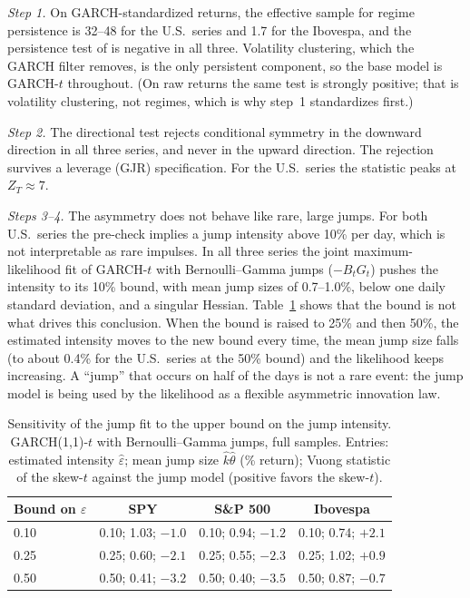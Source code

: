 \documentclass[11pt,a4paper]{article}
\theoremstyle{definition}
\theoremstyle{remark}
\begin{document}
\emph{Step 1.} On GARCH-standardized returns, the effective sample for regime persistence is 32--48 for the U.S.\ series and 1.7 for the Ibovespa, and the persistence test of \citet{giornoA} is negative in all three. Volatility clustering, which the GARCH filter removes, is the only persistent component, so the base model is GARCH-$t$ throughout. (On raw returns the same test is strongly positive; that is volatility clustering, not regimes, which is why step~1 standardizes first.)

\emph{Step 2.} The directional test rejects conditional symmetry in the downward direction in all three series, and never in the upward direction. The rejection survives a leverage (GJR) specification. For the U.S.\ series the statistic peaks at $Z_T\approx7$.

\emph{Steps 3--4.} The asymmetry does not behave like rare, large jumps. For both U.S.\ series the pre-check implies a jump intensity above 10\% per day, which is not interpretable as rare impulses. In all three series the joint maximum-likelihood fit of GARCH-$t$ with Bernoulli--Gamma jumps ($-B_tG_t$) pushes the intensity to its 10\% bound, with mean jump sizes of 0.7--1.0\%, below one daily standard deviation, and a singular Hessian. Table~\ref{tab:bound} shows that the bound is not what drives this conclusion. When the bound is raised to 25\% and then 50\%, the estimated intensity moves to the new bound every time, the mean jump size falls (to about 0.4\% for the U.S.\ series at the 50\% bound) and the likelihood keeps increasing. A ``jump'' that occurs on half of the days is not a rare event: the jump model is being used by the likelihood as a flexible asymmetric innovation law.

\begin{table}[ht]\centering\footnotesize\setlength{\tabcolsep}{4pt}
\caption{Sensitivity of the jump fit to the upper bound on the jump intensity. GARCH(1,1)-$t$ with Bernoulli--Gamma jumps, full samples. Entries: estimated intensity $\hat\varepsilon$; mean jump size $\hat k\hat\theta$ (\% return); Vuong statistic of the skew-$t$ against the jump model (positive favors the skew-$t$).}\label{tab:bound}
\begin{tabular}{lccc}
\toprule
Bound on $\varepsilon$ & SPY & S\&P 500 & Ibovespa\\
\midrule
0.10 & 0.10; 1.03; $-1.0$ & 0.10; 0.94; $-1.2$ & 0.10; 0.74; $+2.1$\\
0.25 & 0.25; 0.60; $-2.1$ & 0.25; 0.55; $-2.3$ & 0.25; 1.02; $+0.9$\\
0.50 & 0.50; 0.41; $-3.2$ & 0.50; 0.40; $-3.5$ & 0.50; 0.87; $-0.7$\\
\bottomrule
\end{tabular}
\end{table}
\end{document}
